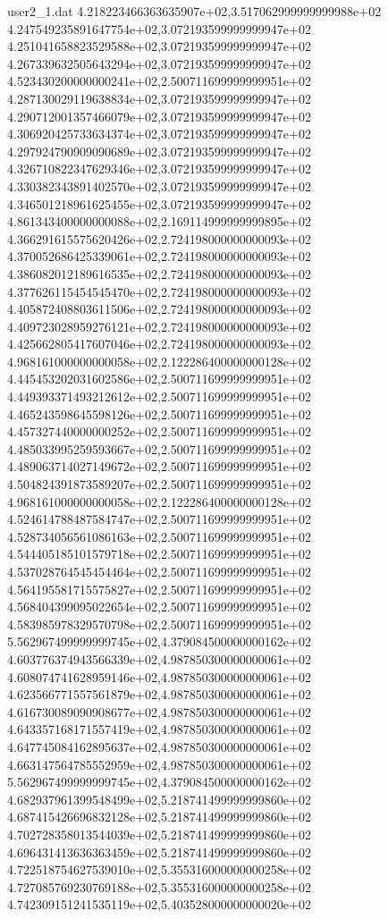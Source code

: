 \begin{filecontents}{user2_1.dat}
4.218223466363635907e+02,3.517062999999999988e+02
4.247549235891647754e+02,3.072193599999999947e+02
4.251041658823529588e+02,3.072193599999999947e+02
4.267339632505643294e+02,3.072193599999999947e+02
4.523430200000000241e+02,2.500711699999999951e+02
4.287130029119638834e+02,3.072193599999999947e+02
4.290712001357466079e+02,3.072193599999999947e+02
4.306920425733634374e+02,3.072193599999999947e+02
4.297924790909090689e+02,3.072193599999999947e+02
4.326710822347629346e+02,3.072193599999999947e+02
4.330382343891402570e+02,3.072193599999999947e+02
4.346501218961625455e+02,3.072193599999999947e+02
4.861343400000000088e+02,2.169114999999999895e+02
4.366291615575620426e+02,2.724198000000000093e+02
4.370052686425339061e+02,2.724198000000000093e+02
4.386082012189616535e+02,2.724198000000000093e+02
4.377626115454545470e+02,2.724198000000000093e+02
4.405872408803611506e+02,2.724198000000000093e+02
4.409723028959276121e+02,2.724198000000000093e+02
4.425662805417607046e+02,2.724198000000000093e+02
4.968161000000000058e+02,2.122286400000000128e+02
4.445453202031602586e+02,2.500711699999999951e+02
4.449393371493212612e+02,2.500711699999999951e+02
4.465243598645598126e+02,2.500711699999999951e+02
4.457327440000000252e+02,2.500711699999999951e+02
4.485033995259593667e+02,2.500711699999999951e+02
4.489063714027149672e+02,2.500711699999999951e+02
4.504824391873589207e+02,2.500711699999999951e+02
4.968161000000000058e+02,2.122286400000000128e+02
4.524614788487584747e+02,2.500711699999999951e+02
4.528734056561086163e+02,2.500711699999999951e+02
4.544405185101579718e+02,2.500711699999999951e+02
4.537028764545454464e+02,2.500711699999999951e+02
4.564195581715575827e+02,2.500711699999999951e+02
4.568404399095022654e+02,2.500711699999999951e+02
4.583985978329570798e+02,2.500711699999999951e+02
5.562967499999999745e+02,4.379084500000000162e+02
4.603776374943566339e+02,4.987850300000000061e+02
4.608074741628959146e+02,4.987850300000000061e+02
4.623566771557561879e+02,4.987850300000000061e+02
4.616730089090908677e+02,4.987850300000000061e+02
4.643357168171557419e+02,4.987850300000000061e+02
4.647745084162895637e+02,4.987850300000000061e+02
4.663147564785552959e+02,4.987850300000000061e+02
5.562967499999999745e+02,4.379084500000000162e+02
4.682937961399548499e+02,5.218741499999999860e+02
4.687415426696832128e+02,5.218741499999999860e+02
4.702728358013544039e+02,5.218741499999999860e+02
4.696431413636363459e+02,5.218741499999999860e+02
4.722518754627539010e+02,5.355316000000000258e+02
4.727085769230769188e+02,5.355316000000000258e+02
4.742309151241535119e+02,5.403528000000000020e+02

\end{filecontents}

